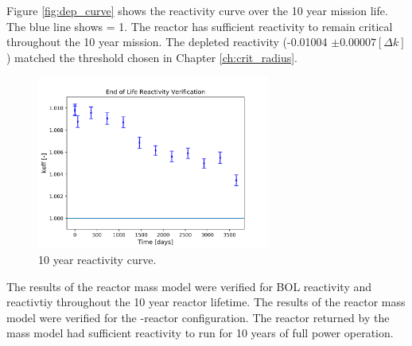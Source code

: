 Figure \ref{fig:dep_curve} shows the reactivity curve over the 10 year mission
life. The blue line shows \keff = 1. The reactor has sufficient reactivity to
remain critical throughout the 10 year mission. The depleted reactivity
(-0.01004 $\pm 0.00007 [\Delta k]$) matched the threshold chosen in 
Chapter \ref{ch:crit_radius}. 

\begin{figure}[h]
    \centering
    \includegraphics[width=3in]{../images/depletion_results.png}
\caption{10 year reactivity curve.}
\label{fig:depl_curve}
\end{figure}

The results of the reactor mass model were verified for BOL reactivity and
reactivtiy throughout the 10 year reactor lifetime. The results of the reactor
mass model were verified for the \uox-\codiox reactor configuration. The reactor
returned by the mass model had sufficient reactivity to run for 10 years of full
power operation.
